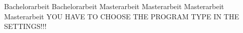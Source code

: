 \begin{center}

\vspace{1cm}

\begin{minipage}[t][5cm][s]{\textwidth}%
\centering
\Huge{{\color{FH2}{\fontsize{24}{30} \selectfont \workTitle\\}}}
\vspace{0.5cm}
\LARGE{{\color{FH2}{\fontsize{16}{24} \selectfont \subTitle\\}}}
\end{minipage}

\vspace{1cm}


\ifnum{}
\else{}
\fi{} 
   	\LARGE{Bachelorarbeit}
\else
	\ifnum{}
	\else{}
\fi{}
	\LARGE{Bachelorarbeit}
\else
	\ifuseMasterInteractiveTechnologies
		\LARGE{Masterarbeit}
	\else
	\ifuseMasterDigitalDesign
		\LARGE{Masterarbeit}
	\else
    \ifuseMasterDigitalMediaProduction
		\LARGE{Masterarbeit}
	\else
	\ifuseMasterDigitalHealthCare
		\LARGE{Masterarbeit}
    \else
        \LARGE{YOU HAVE TO CHOOSE THE PROGRAM TYPE IN THE SETTINGS!!!}
    \fi\fi\fi\fi
\fi\fi






\end{center}
